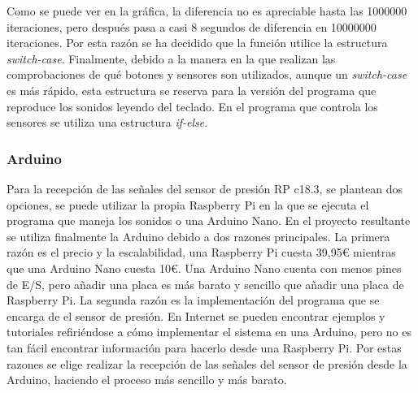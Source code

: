 \documentclass{article}
\begin{document}
            Como se puede ver en la gráfica, la diferencia no es apreciable hasta las 1000000 iteraciones, pero después
            pasa a casi 8 segundos de diferencia en 10000000 iteraciones. Por esta razón se ha decidido que la función
            utilice la estructura \textit{switch-case}.\newline
            Finalmente, debido a la manera en la que realizan las comprobaciones de qué botones y sensores son
            utilizados, aunque un \textit{switch-case} es más rápido, esta estructura se reserva para la versión del
            programa que reproduce los sonidos leyendo del teclado. En el programa que controla los sensores se utiliza
            una estructura \textit{if-else}.



    \subsubsection{Arduino} %
    \label{ssub:Arduino}

        Para la recepción de las señales del sensor de presión RP c18.3, se plantean dos opciones, se puede utilizar
        la propia Raspberry Pi en la que se ejecuta el programa que maneja los sonidos o una Arduino Nano. En el
        proyecto resultante se utiliza finalmente la Arduino debido a dos razones principales.\newline
        La primera razón es el precio y la escalabilidad, una Raspberry Pi cuesta 39,95\euro{} mientras que una
        Arduino Nano cuesta 10\euro{}. Una Arduino Nano cuenta con menos pines de E/S, pero añadir una placa es más
        barato y sencillo que añadir una placa de Raspberry Pi.\newline
        La segunda razón es la implementación del programa que se encarga de el sensor de presión. En Internet se
        pueden encontrar ejemplos y tutoriales refiriéndose a cómo implementar el sistema en una Arduino, pero no
        es tan fácil encontrar información para hacerlo desde una Raspberry Pi.\newline
        Por estas razones se elige realizar la recepción de las señales del sensor de presión desde la Arduino,
        haciendo el proceso más sencillo y más barato.


\end{document}
